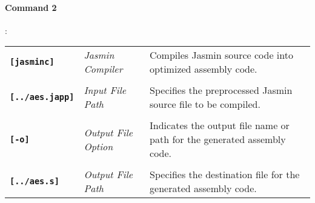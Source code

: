 \paragraph{Command 2}:
\begin{table}[h!]
\begin{tabularx}{\textwidth}{>{\raggedleft\arraybackslash}p{}>{\centering\arraybackslash}p{}p{}}
	\textbf{\texttt{[jasminc]}} & \textit{Jasmin Compiler} & Compiles Jasmin source code into optimized assembly code. \\ \\
	\textbf{\texttt{[../aes.japp]}} & \textit{Input File Path} & Specifies the preprocessed Jasmin source file to be compiled.
	\\ \\
	\textbf{\texttt{[-o]}} & \textit{Output File Option} & Indicates the output file name or path for the generated assembly code.\\ \\
	\textbf{\texttt{[../aes.s]}} & \textit{Output File Path} & Specifies the destination file for the generated assembly code.\\
\end{tabularx}
\end{table}

\newpage
